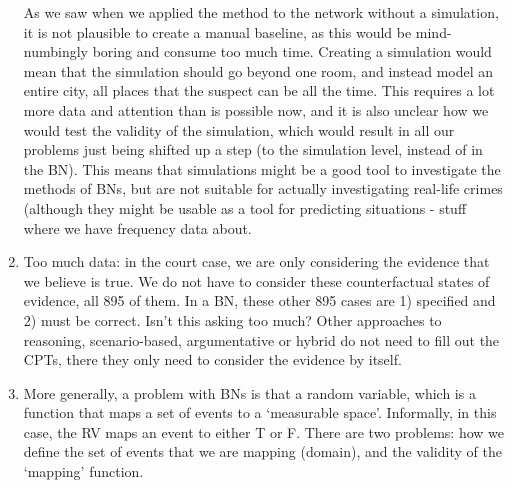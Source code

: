 \documentclass[12pt]{article}
\begin{document}
\begin{enumerate}
As we saw when we applied the method to the network without a simulation, it is not plausible to create a manual baseline, as this would be mind-numbingly boring and consume too much time.  Creating a simulation would mean that the simulation should go beyond one room, and instead model an entire city, all places that the suspect can be all the time. This requires a lot more data and attention than is possible now, and it is also unclear how we would test the validity of the simulation, which would result in all our problems just being shifted up a step (to the simulation level, instead of in the BN). This means that simulations might be a good tool to investigate the methods of BNs, but are not suitable for actually investigating real-life crimes (although they might be usable as a tool for predicting situations - stuff where we have frequency data about.

\item Too much data: in the court case, we are only considering the evidence that we believe is true. We do not have to consider these counterfactual states of evidence, all 895 of them. In a BN, these other 895 cases are 1) specified and 2) must be correct. Isn't this asking too much? Other approaches to reasoning, scenario-based, argumentative or hybrid do not need to fill out the CPTs, there they only need to consider the evidence by itself.


\item More generally, a problem with BNs is that a random variable, which is a function that maps a set of events to a `measurable space'. Informally, in this case, the RV maps an event to either T or F. There are two problems: how we define the set of events that we are mapping (domain), and the validity of the `mapping' function.


\end{enumerate}
\end{document}
